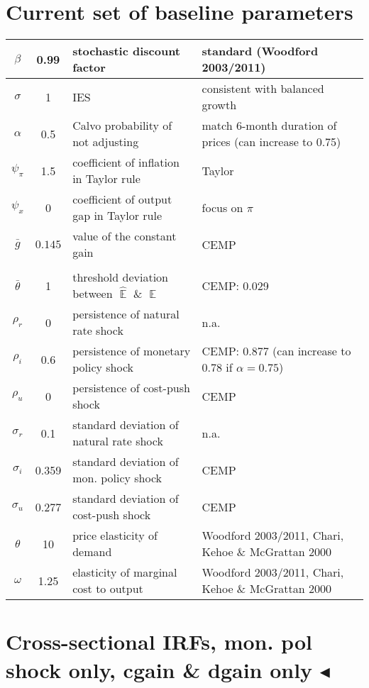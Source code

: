\documentclass[11pt]{article}
\renewcommand{\[}{\begin{equation}}
\renewcommand{\]}{\end{equation}}
\DeclareMathOperator{\E}{\mathbb{E}}
\begin{document}
\section{Current set of baseline parameters}
\begin{tabular}{ c | c  | l | l}
 $\beta$ & 0.99 & stochastic discount factor & standard (Woodford 2003/2011) \\  \hline
 $\sigma$ & 1  & IES & consistent with balanced growth \\  \hline
 $\alpha$ & 0.5 &  Calvo probability of not adjusting  & match 6-month duration of prices (can increase to 0.75)\\\hline
 $\psi_{\pi} $& 1.5  & coefficient of inflation in Taylor rule & Taylor \\\hline
 $\psi_x$ & 0   & coefficient of output gap in Taylor rule  & focus on $\pi$\\\hline
 $\bar{g}$ & $0.145$  & value of the constant gain & CEMP \\\hline
& & \\ [-1em] %
 $\bar{\theta}$ &  1  & threshold deviation between $\hat{\E}$ \& $\E$ & CEMP: 0.029\\ \hline
    $\rho_r$ & 0 &   persistence of natural rate shock & n.a. \\ \hline
    $\rho_i$ & 0.6 &  persistence of monetary policy shock & CEMP: 0.877  (can increase to 0.78 if $\alpha=0.75$) \\ \hline
    $\rho_u$ & 0  &  persistence of cost-push shock  & CEMP\\ \hline
    $\sigma_r$ & 0.1 & standard deviation of natural rate shock & n.a. \\ \hline
    $\sigma_i$ &  0.359  &standard deviation of mon. policy shock & CEMP \\ \hline
    $\sigma_u$ & 0.277 & standard deviation of cost-push shock & CEMP  \\ \hline
    $\theta$ & 10 & price elasticity of demand &Woodford 2003/2011, Chari, Kehoe \& McGrattan 2000  \\ \hline
    $\omega$ & 1.25 & elasticity of marginal cost to output &Woodford 2003/2011,  Chari, Kehoe \& McGrattan 2000  \\ \hline
\end{tabular}

\newpage
\section{Cross-sectional IRFs, mon. pol shock only, cgain \& dgain only $\blacktriangleleft$}	
\end{document}
